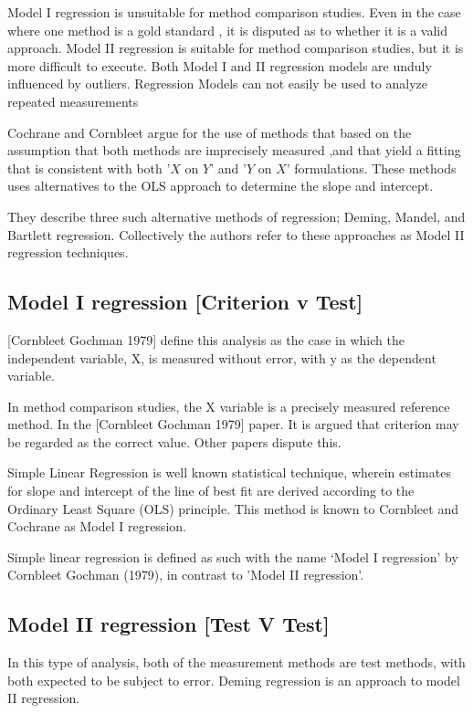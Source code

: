 \documentclass[12pt, a4paper]{report}
\theoremstyle{plain}
\theoremstyle{definition}
\theoremstyle{remark}
\begin{document}
Model I regression is unsuitable for method comparison studies. Even in the case where one method is a gold standard , it is disputed as to whether it is a valid approach. Model II regression is suitable for method comparison studies, but it is more difficult to execute. Both Model I and II regression models are unduly influenced by outliers.
Regression Models can not easily be used to analyze repeated measurements


Cochrane and Cornbleet argue for the use of methods that based on
the assumption that both methods are imprecisely measured ,and
that yield a fitting that is consistent with both '$X$ on $Y$' and
'$Y$ on $X$' formulations. These methods uses alternatives to the
OLS approach to determine the slope and intercept.

They describe three such alternative methods of regression; Deming, Mandel, and Bartlett regression. Collectively the authors refer to these approaches as Model II regression techniques.

\subsection{Model I regression [Criterion v Test]}
[Cornbleet Gochman 1979] define this analysis as the case in which the independent variable, X, is measured without error, with y as the dependent variable.
 
In method comparison studies, the X variable is a precisely measured reference method. In the [Cornbleet Gochman 1979] paper. It is argued that criterion may be regarded as the correct value. Other papers dispute this.
 

Simple Linear Regression is well known statistical technique, wherein estimates for slope and
intercept of the line of best fit are derived according to the Ordinary Least Square (OLS) principle. This method is known to Cornbleet and Cochrane as Model I regression.

Simple linear regression is defined as such with the name `Model I regression' by Cornbleet Gochman (1979), in contrast to 'Model II regression'.

 
\subsection{Model II regression [Test V Test]}
In this type of analysis, both of the measurement methods are test methods, with both expected to be subject to error. Deming regression is an approach to model II regression.
\end{document}
